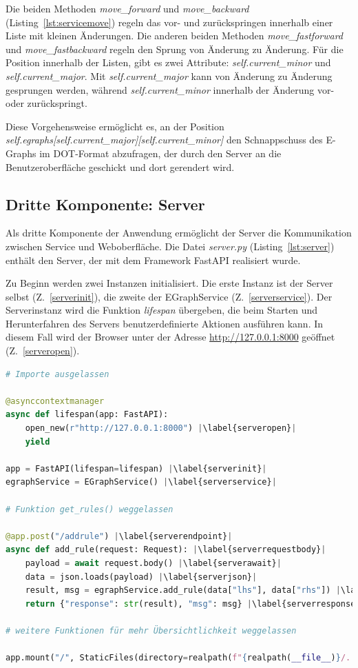 Die beiden Methoden \textit{move\_forward} und \textit{move\_backward} (Listing~\ref{lst:servicemove}) regeln das vor- und zurückspringen innerhalb einer Liste mit kleinen Änderungen.
Die anderen beiden Methoden \textit{move\_fastforward} und \textit{move\_fastbackward} regeln den Sprung von Änderung zu Änderung.
Für die Position innerhalb der Listen, gibt es zwei Attribute: \textit{self.current\_minor} und \textit{self.current\_major}. Mit \textit{self.current\_major} kann von Änderung
zu Änderung gesprungen werden, während \textit{self.current\_minor} innerhalb der Änderung vor- oder zurückspringt.

Diese Vorgehensweise ermöglicht es, an der Position \textit{self.egraphs[self.current\_major][self.current\_minor]} den Schnappschuss des E-Graphs im DOT-Format abzufragen,
der durch den Server an die Benutzeroberfläche geschickt und dort gerendert wird.

\subsection{Dritte Komponente: Server}

Als dritte Komponente der Anwendung ermöglicht der Server die Kommunikation zwischen Service und Weboberfläche. 
Die Datei \textit{server.py} (Listing~\ref{lst:server}) enthält den Server, der mit dem Framework FastAPI realisiert wurde.

\noindent Zu Beginn werden zwei Instanzen initialisiert. Die erste Instanz ist der Server selbst (Z.~\ref{serverinit}), die zweite der EGraphService (Z.~\ref{serverservice}).
Der Serverinstanz wird die Funktion \textit{lifespan} übergeben, die beim Starten und Herunterfahren des Servers benutzerdefinierte Aktionen ausführen kann.
In diesem Fall wird der Browser unter der Adresse \url{http://127.0.0.1:8000} geöffnet (Z.~\ref{serveropen}).

\begin{lstlisting}[language=Python, escapechar=|, caption=Auszug aus der Datei \textit{server.py}, label={lst:server}]
# Importe ausgelassen 

@asynccontextmanager
async def lifespan(app: FastAPI):
    open_new(r"http://127.0.0.1:8000") |\label{serveropen}|
    yield

app = FastAPI(lifespan=lifespan) |\label{serverinit}|
egraphService = EGraphService() |\label{serverservice}|

# Funktion get_rules() weggelassen

@app.post("/addrule") |\label{serverendpoint}|
async def add_rule(request: Request): |\label{serverrequestbody}|
    payload = await request.body() |\label{serverawait}|
    data = json.loads(payload) |\label{serverjson}|
    result, msg = egraphService.add_rule(data["lhs"], data["rhs"]) |\label{serveraction}|
    return {"response": str(result), "msg": msg} |\label{serverresponse}|

# weitere Funktionen für mehr Übersichtlichkeit weggelassen 

app.mount("/", StaticFiles(directory=realpath(f"{realpath(__file__)}/../static"), html=True), name="static") |\label{serverend}|
\end{lstlisting} 

